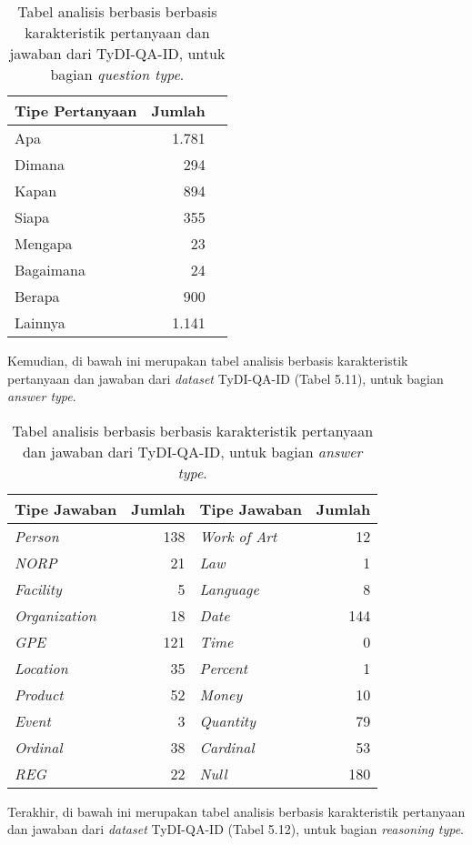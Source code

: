 \begin{table}[H]\centering
\begin{tabular}{lrr}\toprule
Tipe Pertanyaan &Jumlah \\\midrule
Apa &1.781 \\
Dimana &294 \\
Kapan &894 \\
Siapa &355 \\
Mengapa &23 \\
Bagaimana &24 \\
Berapa &900 \\
Lainnya &1.141 \\
\bottomrule
\end{tabular}
\caption{Tabel analisis berbasis berbasis karakteristik pertanyaan dan jawaban dari TyDI-QA-ID, untuk bagian \emph{question type}.}
\end{table}

Kemudian, di bawah ini merupakan tabel analisis berbasis karakteristik pertanyaan dan jawaban dari \emph{dataset} TyDI-QA-ID (Tabel 5.11), untuk bagian \emph{answer type}.

\begin{table}[H]\centering
\begin{tabular}{lr|lr}
\toprule
Tipe Jawaban & Jumlah & Tipe Jawaban & Jumlah \\
\midrule
\emph{Person} & 138 & \emph{Work of Art} & 12 \\
\emph{NORP} & 21 & \emph{Law} & 1 \\
\emph{Facility} & 5 & \emph{Language} & 8 \\
\emph{Organization} & 18 & \emph{Date} & 144 \\
\emph{GPE} & 121 & \emph{Time} & 0 \\
\emph{Location} & 35 & \emph{Percent} & 1 \\
\emph{Product} & 52 & \emph{Money} & 10 \\
\emph{Event} & 3 & \emph{Quantity} & 79 \\
\emph{Ordinal} & 38 & \emph{Cardinal} & 53 \\
\emph{REG} & 22 & \emph{Null} & 180 \\
\bottomrule
\end{tabular}
\caption{Tabel analisis berbasis berbasis karakteristik pertanyaan dan jawaban dari TyDI-QA-ID, untuk bagian \emph{answer type}.}
\end{table}

Terakhir, di bawah ini merupakan tabel analisis berbasis karakteristik pertanyaan dan jawaban dari \emph{dataset} TyDI-QA-ID (Tabel 5.12), untuk bagian \emph{reasoning type}.

